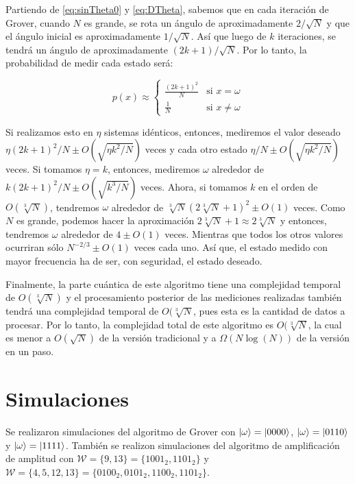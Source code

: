 Partiendo de \ref{eq:sinTheta0} y \ref{eq:DTheta}, sabemos que en cada iteración de Grover, cuando $N$ es grande, se rota un ángulo de aproximadamente $2/\sqrt{N}$ y que el ángulo inicial es aproximadamente $1/\sqrt{N}$. Así que luego de $k$ iteraciones, se tendrá un ángulo de aproximadamente $(2k + 1)/\sqrt{N}$. Por lo tanto, la probabilidad de medir cada estado será:

\begin{equation}
    p(x) \approx
    \begin{cases}
        \frac{(2k + 1)^2}{N} & \text{si } x = \omega \\
        \frac{1}{N} & \text{si } x \neq \omega
    \end{cases}
\end{equation}

Si realizamos esto en $\eta$ sistemas idénticos, entonces, mediremos el valor deseado $\eta (2k + 1)^2 / N \pm O(\sqrt{\eta k^2/N})$ veces y cada otro estado $\eta / N \pm O(\sqrt{\eta k^2/N})$ veces. Si tomamos $\eta = k$, entonces, mediremos $\omega$ alrededor de $k (2k + 1)^2 / N \pm O(\sqrt{k^3/N})$ veces. Ahora, si tomamos $k$ en el orden de $O(\sqrt[3]{N})$, tendremos $\omega$ alrededor de $\sqrt[3]{N} ( 2 \sqrt[3]{N} + 1)^2 \pm O(1)$ veces. Como $N$ es grande, podemos hacer la aproximación $2 \sqrt[3]{N} + 1 \approx 2 \sqrt[3]{N}$ y entonces, tendremos $\omega$ alrededor de $4 \pm O(1)$ veces. Mientras que todos los otros valores ocurriran sólo $N^{-2/3} \pm O(1)$ veces cada uno. Así que, el estado medido con mayor frecuencia ha de ser, con seguridad, el estado deseado.

Finalmente, la parte cuántica de este algoritmo tiene una complejidad temporal de $O(\sqrt[3]{N})$ y el procesamiento posterior de las mediciones realizadas también tendrá una complejidad temporal de $O(\sqrt[3]{N}$, pues esta es la cantidad de datos a procesar. Por lo tanto, la complejidad total de este algoritmo es $O(\sqrt[3]{N}$, la cual es menor a $O(\sqrt{N})$ de la versión tradicional y a $\Omega(N \log(N))$ de la versión en un paso.

\section{Simulaciones}

Se realizaron simulaciones del algoritmo de Grover con $\ket{\omega} = \ket{0000}$, $\ket{\omega} = \ket{0110}$ y $\ket{\omega} = \ket{1111}$. También se realizon simulaciones del algoritmo de amplificación de amplitud con $\mathcal{W} = \{9, 13\} = \{1001_2, 1101_2 \}$ y $\mathcal{W} = \{4, 5, 12, 13\} = \{0100_2, 0101_2, 1100_2, 1101_2\}$.

